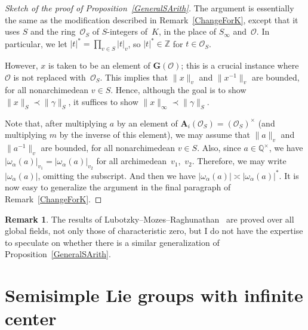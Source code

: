 \documentclass[pdftex]{sigma}
\newcommand{\QQ}{\mathbb{Q}}
\newcommand{\ZZ}{\mathbb{Z}}
\newcommand{\Aa}{\mathbf{A}}
\newcommand{\Ga}{\mathbf{G}}
\newcommand{\ints}{\mathcal{O}}
\numberwithin{equation}{section}
\theoremstyle{definition}
\newtheorem{rem}[thm]{Remark}
\begin{document}
\begin{proof}[Sketch of the proof of Proposition~\ref{GeneralSArith}]
The argument is essentially the same as the modification described in Remark~\ref{ChangeForK}, except that it uses $S$ and the ring~$\ints_S$ of $S$-integers of~$K$, in the place of $S_\infty$ and~$\ints$. In particular, we let $|t|^* = \prod\limits_{v \in S} |t|_v$, so $|t|^* \in \ZZ$ for $t \in \ints_S$.

However, $x$ is taken to be an element of $\Ga(\ints)$; this is a crucial instance where $\ints$ is not replaced with~$\ints_S$. This implies that $\|x\|_v$ and $\big\|x^{-1}\big\|_v$ are bounded, for all nonarchimedean $v \in S$. Hence, although the goal is to show $\|x\|_S \prec \| \gamma \|_S$, it suffices to show $\|x\|_\infty \prec \| \gamma \|_S$.

Note that, after multiplying $a$ by an element of $\Aa_i(\ints_S) = (\ints_S)^\times$ (and multiplying $m$ by the inverse of this element), we may assume that $\|a\|_v$ and $\big\|a^{-1}\big\|_v$ are bounded, for all nonarchimedean $v \in S$. Also, since $a \in \QQ^\times$, we have $|\omega_\alpha(a)|_{v_1} = |\omega_\alpha(a)|_{v_2}$ for all archimedean~$v_1$,~$v_2$. Therefore, we may write $ |\omega_\alpha(a)|$, omitting the subscript. And then we have $|\omega_\alpha(a)| \asymp |\omega_\alpha(a)|^*$.
It is now easy to generalize the argument in the final paragraph of Remark~\ref{ChangeForK}.
\end{proof}

\begin{rem}The results of Lubotzky--Mozes--Raghunathan~\cite{MR1828742} are proved over all global fields, not only those of characteristic zero, but I do not have the expertise to speculate on whether there is a similar generalization of Proposition~\ref{GeneralSArith}.
\end{rem}

\section{Semisimple Lie groups with infinite center} \label{InfiniteCenterSect}
\end{document}
